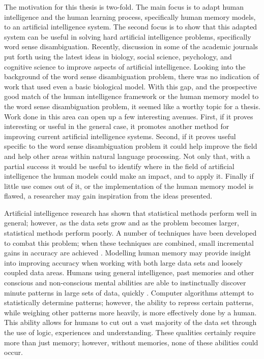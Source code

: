 The motivation for this thesis is two-fold.  The main focus is to adapt human
intelligence and the human learning process, specifically human memory models,
to an artificial intelligence system.  The second focus is to show that this
adapted system can be useful in solving hard artificial intelligence problems,
specifically word sense disambiguation.  Recently, discussion in some of the
academic journals put forth using the latest ideas in biology, social science,
psychology, and cognitive science to improve aspects of artificial intelligence.
Looking into the background of the word sense disambiguation problem, there was
no indication of work that used even a basic biological model. With this gap,
and the prospective good match of the human intelligence framework or the human
memory model to the word sense disambiguation problem, it seemed like a worthy
topic for a thesis.  Work done in this area can open up a few interesting
avenues. First, if it proves interesting or useful in the general case, it
promotes another method for improving current artificial intelligence systems.
Second, if it proves useful specific to the word sense disambiguation problem it
could help improve the field and help other areas within natural language
processing.  Not only that, with a partial success it would be useful to
identify where in the field of artificial intelligence the human models could
make an impact, and to apply it.  Finally if little use comes out of it, or the
implementation of the human memory model is flawed, a researcher may gain
inspiration from the ideas presented.

Artificial intelligence research has shown that statistical methods perform well
in general; however, as the data sets grow and as the problem becomes larger,
statistical methods perform poorly.  A number of techniques have been developed
to combat this problem; when these techniques are combined, small incremental
gains in accuracy are achieved \cite{ENSEMBLE2}.  Modelling human memory may
provide insight into improving accuracy when working with both large data sets
and loosely coupled data areas.  Humans using general intelligence, past
memories and other conscious and non-conscious mental abilities are able to
instinctually discover minute patterns in large sets of data, quickly
\cite{BLINK}.  Computer algorithms attempt to statistically determine patterns;
however, the ability to repress certain patterns, while weighing other patterns
more heavily, is more effectively done by a human.  This ability allows for
humans to cut out a vast majority of the data set through the use of logic,
experiences and understanding.  These qualities certainly require more than just
memory; however, without memories, none of these abilities could occur.

